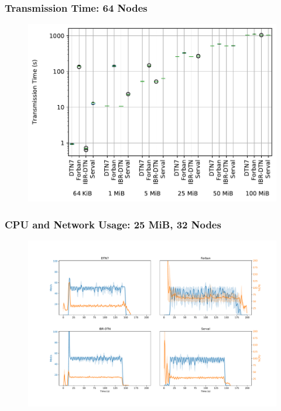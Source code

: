 \begin{frame}
  \frametitle{Transmission Time: 64 Nodes}

  \begin{figure}
    \includegraphics[width=0.8\linewidth,keepaspectratio]{include/chain-runtimes-64}
  \end{figure}
\end{frame}

\begin{frame}
  \frametitle{CPU and Network Usage: 25 MiB, 32 Nodes}

  \begin{figure}
    \includegraphics[width=0.9\linewidth,keepaspectratio]{include/cpu-load}
  \end{figure}
\end{frame}
